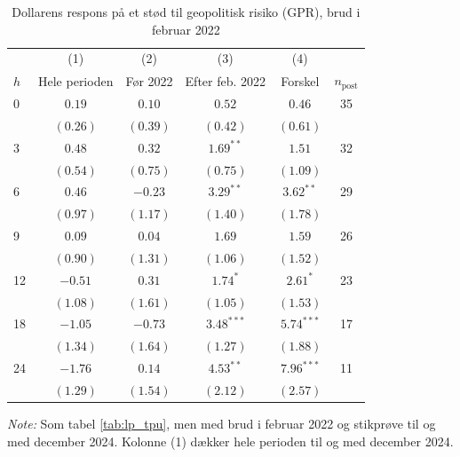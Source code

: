 \begin{table}[htbp]
\centering
\caption{Dollarens respons på et stød til geopolitisk risiko (GPR), brud i februar 2022}
\label{tab:lp_gpr_2022}
\begin{threeparttable}
\begin{tabular}{l cccc c}
\toprule
 & (1) & (2) & (3) & (4) & \\
$h$ & Hele perioden & Før 2022 & Efter feb. 2022 & Forskel & $n_{\text{post}}$ \\
\midrule
0 & $0.19$ & $0.10$ & $0.52$ & $0.46$ & 35 \\
 & $(0.26)$ & $(0.39)$ & $(0.42)$ & $(0.61)$ & \\[2pt]
3 & $0.48$ & $0.32$ & $1.69^{**}$ & $1.51$ & 32 \\
 & $(0.54)$ & $(0.75)$ & $(0.75)$ & $(1.09)$ & \\[2pt]
6 & $0.46$ & $-0.23$ & $3.29^{**}$ & $3.62^{**}$ & 29 \\
 & $(0.97)$ & $(1.17)$ & $(1.40)$ & $(1.78)$ & \\[2pt]
9 & $0.09$ & $0.04$ & $1.69$ & $1.59$ & 26 \\
 & $(0.90)$ & $(1.31)$ & $(1.06)$ & $(1.52)$ & \\[2pt]
12 & $-0.51$ & $0.31$ & $1.74^{*}$ & $2.61^{*}$ & 23 \\
 & $(1.08)$ & $(1.61)$ & $(1.05)$ & $(1.53)$ & \\[2pt]
18 & $-1.05$ & $-0.73$ & $3.48^{***}$ & $5.74^{***}$ & 17 \\
 & $(1.34)$ & $(1.64)$ & $(1.27)$ & $(1.88)$ & \\[2pt]
24 & $-1.76$ & $0.14$ & $4.53^{**}$ & $7.96^{***}$ & 11 \\
 & $(1.29)$ & $(1.54)$ & $(2.12)$ & $(2.57)$ & \\[2pt]
\bottomrule
\end{tabular}
\begin{tablenotes}[flushleft]\footnotesize
\item \textit{Note:} Som tabel \ref{tab:lp_tpu}, men med brud i februar 2022 og stikprøve til og med december 2024. Kolonne (1) dækker hele perioden til og med december 2024.
\end{tablenotes}
\end{threeparttable}
\end{table}